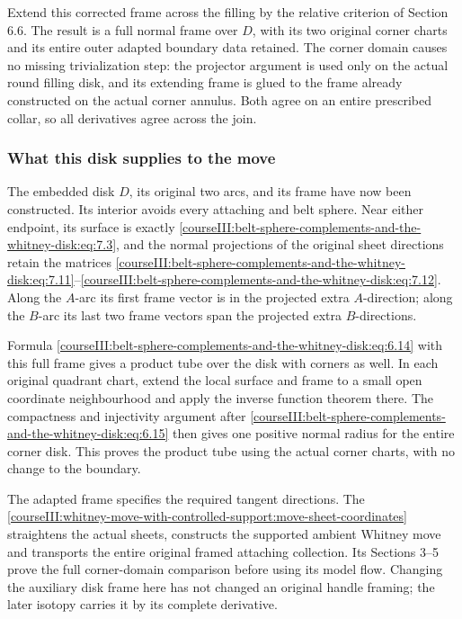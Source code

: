 Extend this corrected frame across the filling by the relative criterion of Section 6.6. The result is a full normal frame over \(D\), with its two original corner charts and its entire outer adapted boundary data retained. The corner domain causes no missing trivialization step: the projector argument is used only on the actual round filling disk, and its extending frame is glued to the frame already constructed on the actual corner annulus. Both agree on an entire prescribed collar, so all derivatives agree across the join.

\subsubsection{What this disk supplies to the move}
\label{courseIII:belt-sphere-complements-and-the-whitney-disk:section-7.6}

The embedded disk \(D\), its original two arcs, and its frame have now been constructed. Its interior avoids every attaching and belt sphere. Near either endpoint, its surface is exactly \eqref{courseIII:belt-sphere-complements-and-the-whitney-disk:eq:7.3}, and the normal projections of the original sheet directions retain the matrices \eqref{courseIII:belt-sphere-complements-and-the-whitney-disk:eq:7.11}--\eqref{courseIII:belt-sphere-complements-and-the-whitney-disk:eq:7.12}. Along the \(A\)-arc its first frame vector is in the projected extra \(A\)-direction; along the \(B\)-arc its last two frame vectors span the projected extra \(B\)-directions.

Formula \eqref{courseIII:belt-sphere-complements-and-the-whitney-disk:eq:6.14} with this full frame gives a product tube over the disk with corners as well. In each original quadrant chart, extend the local surface and frame to a small open coordinate neighbourhood and apply the inverse function theorem there. The compactness and injectivity argument after \eqref{courseIII:belt-sphere-complements-and-the-whitney-disk:eq:6.15} then gives one positive normal radius for the entire corner disk. This proves the product tube using the actual corner charts, with no change to the boundary.

The adapted frame specifies the required tangent directions. The \cref{courseIII:whitney-move-with-controlled-support:move-sheet-coordinates} straightens the actual sheets, constructs the supported ambient Whitney move and transports the entire original framed attaching collection. Its Sections 3--5 prove the full corner-domain comparison before using its model flow. Changing the auxiliary disk frame here has not changed an original handle framing; the later isotopy carries it by its complete derivative.

